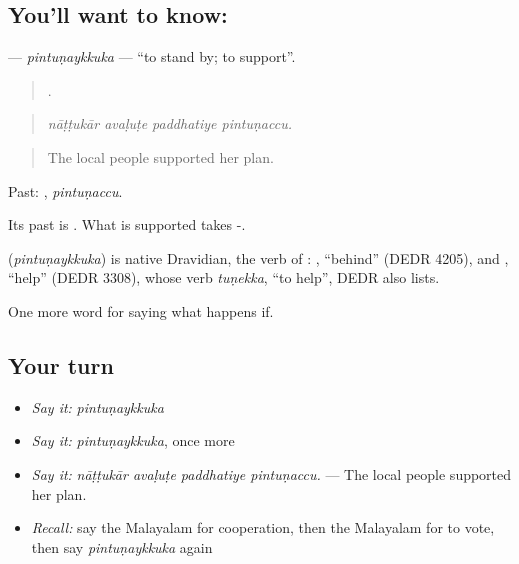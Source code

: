 \subsection*{You'll want to know: }
\textbf{} — \emph{pintuṇaykkuka} — \textquotedblleft{}to stand by; to support\textquotedblright{}.

\begin{quote}
   .
\end{quote}

\begin{quote}
\emph{nāṭṭukār avaḷuṭe paddhatiye pintuṇaccu.}
\end{quote}

\begin{quote}
The local people supported her plan.
\end{quote}

Past: , \emph{pintuṇaccu}.

Its past is . What is supported takes -.

\begin{cousinweb}
\textbf{} (\emph{pintuṇaykkuka}) is native Dravidian, the verb of : , \textquotedblleft{}behind\textquotedblright{} (DEDR 4205), and , \textquotedblleft{}help\textquotedblright{} (DEDR 3308), whose verb \emph{tuṇekka}, \textquotedblleft{}to help\textquotedblright{}, DEDR also lists.
\end{cousinweb}

\begin{grammarlens}[title={What you've built}]
One more word for saying what happens if.
\end{grammarlens}

\subsection*{Your turn}
\begin{itemize}
\raggedright
  \item \emph{Say it:} \emph{pintuṇaykkuka}
  \item \emph{Say it:} \emph{pintuṇaykkuka}, once more
  \item \emph{Say it:} \emph{nāṭṭukār avaḷuṭe paddhatiye pintuṇaccu.} — The local people supported her plan.
  \item \emph{Recall:} say the Malayalam for cooperation, then the Malayalam for to vote, then say \emph{pintuṇaykkuka} again
\end{itemize}

